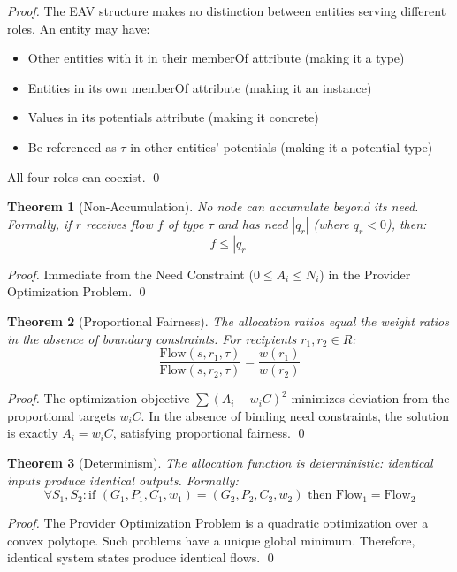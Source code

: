 \documentclass[11pt]{article}
\newtheorem{theorem}{Theorem}
\begin{document}
\begin{proof}
The EAV structure makes no distinction between entities serving different roles. An entity may have:
\begin{itemize}
\item Other entities with it in their memberOf attribute (making it a type)
\item Entities in its own memberOf attribute (making it an instance)
\item Values in its potentials attribute (making it concrete)
\item Be referenced as $\tau$ in other entities' potentials (making it a potential type)
\end{itemize}
All four roles can coexist. \qed
\end{proof}

\begin{theorem}[Non-Accumulation]
No node can accumulate beyond its need. Formally, if $r$ receives flow $f$ of type $\tau$ and has need $|q_r|$ (where $q_r < 0$), then:
\[
f \leq |q_r|
\]
\end{theorem}

\begin{proof}
Immediate from the Need Constraint ($0 \le A_i \le N_i$) in the Provider Optimization Problem. \qed
\end{proof}

\begin{theorem}[Proportional Fairness]
The allocation ratios equal the weight ratios in the absence of boundary constraints. For recipients $r_1, r_2 \in R$:
\[
\frac{\text{Flow}(s, r_1, \tau)}{\text{Flow}(s, r_2, \tau)} = \frac{w(r_1)}{w(r_2)}
\]
\end{theorem}

\begin{proof}
The optimization objective $\sum (A_i - w_i C)^2$ minimizes deviation from the proportional targets $w_i C$. In the absence of binding need constraints, the solution is exactly $A_i = w_i C$, satisfying proportional fairness. \qed
\end{proof}

\begin{theorem}[Determinism]
The allocation function is deterministic: identical inputs produce identical outputs. Formally:
\[
\forall S_1, S_2: \text{if } (G_1, P_1, C_1, w_1) = (G_2, P_2, C_2, w_2) \text{ then } \text{Flow}_1 = \text{Flow}_2
\]
\end{theorem}

\begin{proof}
The Provider Optimization Problem is a quadratic optimization over a convex polytope. Such problems have a unique global minimum. Therefore, identical system states produce identical flows. \qed
\end{proof}
\end{document}

